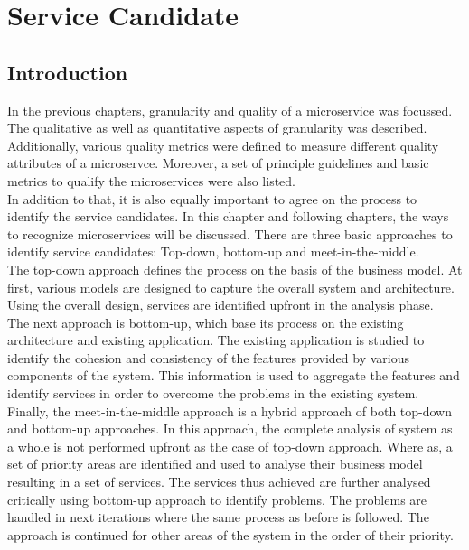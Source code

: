 \chapter{Service Candidate}\label{chapter:service_candidate}

\section{Introduction}\label{section:service_candidate/introduction}
In the previous chapters, granularity and quality of a microservice was focussed. The qualitative as well as quantitative aspects of granularity was described. Additionally, various quality metrics were defined to measure different quality attributes of a microservce. Moreover, a set of principle guidelines and basic metrics to qualify the microservices were also listed.\\
In addition to that, it is also equally important to agree on the process to identify the service candidates. In this chapter and following chapters, the ways to recognize microservices will be discussed.
There are three basic approaches to identify service candidates: Top-down, bottom-up and meet-in-the-middle. \\
The top-down approach defines the process on the basis of the business model. At first, various models are designed to capture the overall system and architecture. Using the overall design, services are identified upfront in the analysis phase.\\
The next approach is bottom-up, which base its process on the existing architecture and existing application. The existing application is studied to identify the cohesion and consistency of the features provided by various components of the system. This information is used to aggregate the features and identify services in order to overcome the problems in the existing system.\\
Finally, the meet-in-the-middle approach is a hybrid approach of both top-down and bottom-up approaches. In this approach, the complete analysis of system as a whole is not performed upfront as the case of top-down approach. Where as, a set of priority areas are identified and used to analyse their business model resulting in a set of services. The services thus achieved are further analysed critically using bottom-up approach to identify problems. The problems are handled in next iterations where the same process as before is followed. The approach is continued for other areas of the system in the order of their priority.\cite{Pierre-Reldin:2007aa}\cite{Arsanjani:2004aa}

